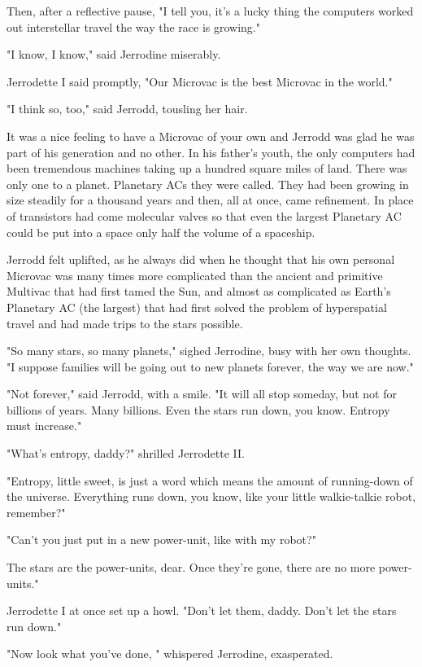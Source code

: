 \documentclass[11pt,twocolumn,paper=a5,pagesize]{article}
\begin{document}
{Then, after a reflective pause, "I tell you, it's a lucky thing the computers worked out interstellar travel the way the race is growing."

"I know, I know," said Jerrodine miserably.

Jerrodette I said promptly, "Our Microvac is the best Microvac in the world."

"I think so, too," said Jerrodd, tousling her hair.

It was a nice feeling to have a Microvac of your own and Jerrodd was glad he was part of his generation and no other. In his father's youth, the only computers had been tremendous machines taking up a hundred square miles of land. There was only one to a planet. Planetary ACs they were called. They had been growing in size steadily for a thousand years and then, all at once, came refinement. In place of transistors had come molecular valves so that even the largest Planetary AC could be put into a space only half the volume of a spaceship.

Jerrodd felt uplifted, as he always did when he thought that his own personal Microvac was many times more complicated than the ancient and primitive Multivac that had first tamed the Sun, and almost as complicated as Earth's Planetary AC (the largest) that had first solved the problem of hyperspatial travel and had made trips to the stars possible.

"So many stars, so many planets," sighed Jerrodine, busy with her own thoughts. "I suppose families will be going out to new planets forever, the way we are now."

"Not forever," said Jerrodd, with a smile. "It will all stop someday, but not for billions of years. Many billions. Even the stars run down, you know. Entropy must increase."

"What's entropy, daddy?" shrilled Jerrodette II.

"Entropy, little sweet, is just a word which means the amount of running-down of the universe. Everything runs down, you know, like your little walkie-talkie robot, remember?"

"Can't you just put in a new power-unit, like with my robot?"

The stars are the power-units, dear. Once they're gone, there are no more power-units."

Jerrodette I at once set up a howl. "Don't let them, daddy. Don't let the stars run down."

"Now look what you've done, " whispered Jerrodine, exasperated.

}
\end{document}
